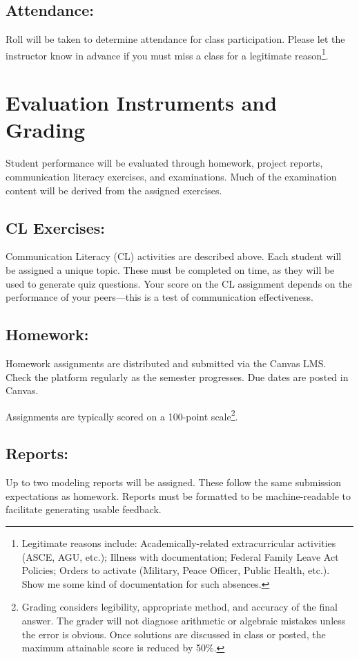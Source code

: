\documentclass[12pt]{article}
\begin{document}
\subsection*{Attendance:} Roll will be taken to determine attendance for class participation.  Please let the instructor know in advance if you must miss a class for a legitimate reason\footnote{Legitimate reasons include: Academically-related extracurricular activities (ASCE, AGU, etc.); Illness with documentation; Federal Family Leave Act Policies; Orders to activate (Military, Peace Officer, Public Health, etc.).  Show me some kind of documentation for such absences.}. 

\section*{Evaluation Instruments and Grading}

Student performance will be evaluated through homework, project reports, communication literacy exercises, and examinations. Much of the examination content will be derived from the assigned exercises.

\subsection*{CL Exercises:}
Communication Literacy (CL) activities are described above. Each student will be assigned a unique topic. These must be completed on time, as they will be used to generate quiz questions. Your score on the CL assignment depends on the performance of your peers—this is a test of communication effectiveness.

\subsection*{Homework:}
Homework assignments are distributed and submitted via the Canvas LMS. Check the platform regularly as the semester progresses. Due dates are posted in Canvas.

Assignments are typically scored on a 100-point scale\footnote{Grading considers legibility, appropriate method, and accuracy of the final answer. The grader will not diagnose arithmetic or algebraic mistakes unless the error is obvious. Once solutions are discussed in class or posted, the maximum attainable score is reduced by 50\%.}.

\subsection*{Reports:}
Up to two modeling reports will be assigned. These follow the same submission expectations as homework. Reports must be formatted to be machine-readable to facilitate generating usable feedback.
\end{document}
